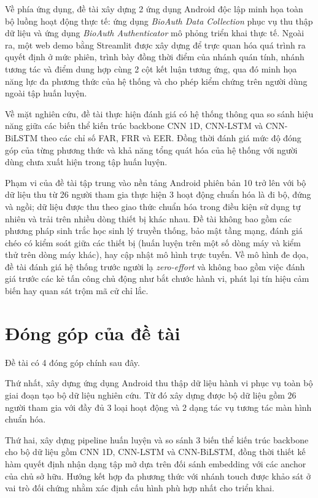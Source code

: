 \documentclass[../DoAn.tex]{subfiles}
\begin{document}
Về phía ứng dụng, đề tài xây dựng 2 ứng dụng Android độc lập minh họa toàn bộ luồng hoạt động thực tế: ứng dụng \textit{BioAuth Data Collection} phục vụ thu thập dữ liệu và ứng dụng \textit{BioAuth Authenticator} mô phỏng triển khai thực tế. Ngoài ra, một web demo bằng Streamlit được xây dựng để trực quan hóa quá trình ra quyết định ở mức phiên, trình bày đồng thời điểm của nhánh quán tính, nhánh tương tác và điểm dung hợp cùng 2 cột kết luận tương ứng, qua đó minh họa năng lực đa phương thức của hệ thống và cho phép kiểm chứng trên người dùng ngoài tập huấn luyện.

Về mặt nghiên cứu, đề tài thực hiện đánh giá có hệ thống thông qua so sánh hiệu năng giữa các biến thể kiến trúc backbone CNN 1D, CNN-LSTM và CNN-BiLSTM theo các chỉ số FAR, FRR và EER. Đồng thời đánh giá mức độ đóng góp của từng phương thức và khả năng tổng quát hóa của hệ thống với người dùng chưa xuất hiện trong tập huấn luyện.

Phạm vi của đề tài tập trung vào nền tảng Android phiên bản 10 trở lên với bộ dữ liệu thu từ 26 người tham gia thực hiện 3 hoạt động chuẩn hóa là đi bộ, đứng và ngồi; dữ liệu được thu theo giao thức chuẩn hóa trong điều kiện sử dụng tự nhiên và trải trên nhiều dòng thiết bị khác nhau. Đề tài không bao gồm các phương pháp sinh trắc học sinh lý truyền thống, bảo mật tầng mạng, đánh giá chéo có kiểm soát giữa các thiết bị (huấn luyện trên một số dòng máy và kiểm thử trên dòng máy khác), hay cập nhật mô hình trực tuyến. Về mô hình đe dọa, đề tài đánh giá hệ thống trước người lạ \textit{zero-effort} và không bao gồm việc đánh giá trước các kẻ tấn công chủ động như bắt chước hành vi, phát lại tín hiệu cảm biến hay quan sát trộm mã cử chỉ lắc.

\section{Đóng góp của đề tài}
\label{sec:donggop}

Đề tài có 4 đóng góp chính sau đây.

Thứ nhất, xây dựng ứng dụng Android thu thập dữ liệu hành vi phục vụ toàn bộ giai đoạn tạo bộ dữ liệu nghiên cứu. Từ đó xây dựng được bộ dữ liệu gồm 26 người tham gia với đầy đủ 3 loại hoạt động và 2 dạng tác vụ tương tác màn hình chuẩn hóa.

Thứ hai, xây dựng pipeline huấn luyện và so sánh 3 biến thể kiến trúc backbone cho bộ dữ liệu gồm CNN 1D, CNN-LSTM và CNN-BiLSTM, đồng thời thiết kế hàm quyết định nhận dạng tập mở dựa trên đối sánh embedding với các anchor của chủ sở hữu. Hướng kết hợp đa phương thức với nhánh touch được khảo sát ở vai trò đối chứng nhằm xác định cấu hình phù hợp nhất cho triển khai.
\end{document}
